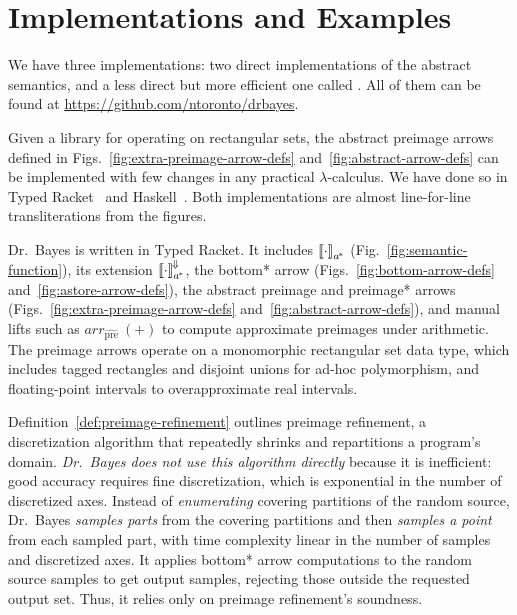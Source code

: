 \documentclass{llncs}
\newcommand{\figref}[1]{Fig.~\ref{#1}}
\newcommand{\figsref}[1]{Figs.~\ref{#1}}
\newcommand{\conv}{^{\mspace{-2mu}\Downarrow\mspace{-2mu}}}
\newcommand{\genc}{_{a^{\mspace{-2mu}*}}}
\newcommand{\prehat}{_\mathrm{\widehat{pre}}}
\begin{document}

\section{Implementations and Examples}
\label{sec:implementation}

We have three implementations: two direct implementations of the abstract semantics, and a less direct but more efficient one called .
All of them can be found at \url{https://github.com/ntoronto/drbayes}.

Given a library for operating on rectangular sets, the abstract preimage arrows defined in \figsref{fig:extra-preimage-arrow-defs} and~\ref{fig:abstract-arrow-defs} can be implemented with few changes in any practical $\lambda$-calculus.
We have done so in Typed Racket~\cite{cit:tobin-hochstadt-2008popl-typed-scheme} and Haskell~\cite{cit:haskell-lang}.
Both implementations are almost line-for-line transliterations from the figures.

Dr.~Bayes is written in Typed Racket.
It includes $\meaningof{\cdot}\genc$ (\figref{fig:semantic-function}), its extension $\meaningof{\cdot}\genc\conv$, the bottom* arrow (\figsref{fig:bottom-arrow-defs} and~\ref{fig:astore-arrow-defs}), the abstract preimage and preimage* arrows (\figsref{fig:extra-preimage-arrow-defs} and~\ref{fig:abstract-arrow-defs}), and manual lifts such as $arr\prehat~(+)$ to compute approximate preimages under arithmetic.
The preimage arrows operate on a monomorphic rectangular set data type, which includes tagged rectangles and disjoint unions for ad-hoc polymorphism, and floating-point intervals to overapproximate real intervals.

Definition~\ref{def:preimage-refinement} outlines preimage refinement, a discretization algorithm that repeatedly shrinks and repartitions a program's domain.
\emph{Dr.~Bayes does not use this algorithm directly} because it is inefficient: good accuracy requires fine discretization, which is exponential in the number of discretized axes.
Instead of \emph{enumerating} covering partitions of the random source, Dr.~Bayes \emph{samples parts} from the covering partitions and then \emph{samples a point} from each sampled part, with time complexity linear in the number of samples and discretized axes.
It applies bottom* arrow computations to the random source samples to get output samples, rejecting those outside the requested output set.
Thus, it relies only on preimage refinement's soundness.
\end{document}
